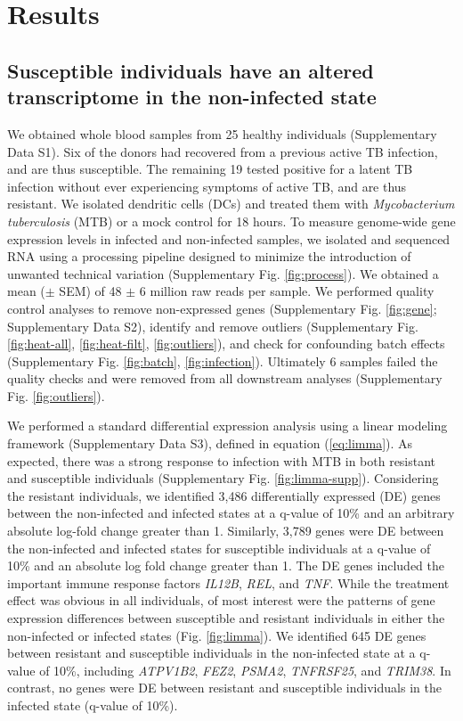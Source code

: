 \documentclass[fleqn,10pt]{wlscirep}
\begin{document}
\section*{Results}

\subsection*{Susceptible individuals have an altered transcriptome in the non-infected state}

We obtained whole blood samples from 25 healthy individuals
(Supplementary Data S1). Six of the donors had recovered from a
previous active TB infection, and are thus susceptible. The remaining
19 tested positive for a latent TB infection without ever experiencing
symptoms of active TB, and are thus resistant. We isolated dendritic
cells (DCs) and treated them with \emph{Mycobacterium
}\emph{tuberculosis} (MTB) or a mock control for 18 hours. To measure
genome-wide gene expression levels in infected and non-infected
samples, we isolated and sequenced RNA using a processing pipeline
designed to minimize the introduction of unwanted technical variation
(Supplementary Fig. \ref{fig:process}). We obtained a mean ($\pm$ SEM)
of 48 $\pm$ 6 million raw reads per sample. We performed quality
control analyses to remove non-expressed genes (Supplementary Fig.
\ref{fig:gene}; Supplementary Data S2), identify and remove outliers
(Supplementary Fig. \ref{fig:heat-all}, \ref{fig:heat-filt},
\ref{fig:outliers}), and check for confounding batch effects
(Supplementary Fig. \ref{fig:batch}, \ref{fig:infection}). Ultimately
6 samples failed the quality checks and were removed from all
downstream analyses (Supplementary Fig. \ref{fig:outliers}).

We performed a standard differential expression analysis using a
linear modeling framework (Supplementary Data S3), defined in equation
(\ref{eq:limma}). As expected, there was a strong response to
infection with MTB in both resistant and susceptible individuals
(Supplementary Fig. \ref{fig:limma-supp}). Considering the resistant
individuals, we identified 3,486 differentially expressed (DE) genes
between the non-infected and infected states at a q-value of 10\% and
an arbitrary absolute log-fold change greater than 1. Similarly, 3,789
genes were DE between the non-infected and infected states for
susceptible individuals at a q-value of 10\% and an absolute log fold
change greater than 1. The DE genes included the important immune
response factors \emph{IL12B}, \emph{REL}, and \emph{TNF}. While the
treatment effect was obvious in all individuals, of most interest were
the patterns of gene expression differences between susceptible and
resistant individuals in either the non-infected or infected states
(Fig. \ref{fig:limma}). We identified 645 DE genes between resistant
and susceptible individuals in the non-infected state at a q-value of
10\%, including \emph{ATPV1B2}, \emph{FEZ2}, \emph{PSMA2},
\emph{TNFRSF25}, and \emph{TRIM38}. In contrast, no genes were DE
between resistant and susceptible individuals in the infected state
(q-value of 10\%).
\end{document}
